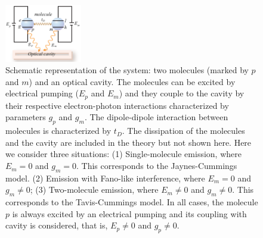 \documentclass[aps,prb,
superscriptaddress,
,twocolumn
,floatfix,footinbib,longbibliography,
]{revtex4-2}
\begin{document}
\begin{figure}
\centering
\includegraphics[width=0.3\textwidth]{junction-1.pdf}
\caption{Schematic representation of the system: two molecules (marked by $p$ and $m$) and an optical cavity. The molecules can be excited by electrical pumping ($E_{p}$ and $E_{m}$) and they couple to the cavity by their respective electron-photon interactions characterized by parameters $g_{p}$ and $g_{m}$. The dipole-dipole interaction between molecules is characterized by $t_{D}$. The dissipation of the molecules and the cavity are included in the theory but not shown here. Here we consider three situations: (1) Single-molecule emission, where $E_{m}=0$ and $g_{m}=0$. This corresponds to the Jaynes-Cummings model. (2) Emission with Fano-like interference, where $E_{m}=0$ and $g_{m}\neq 0$; (3) Two-molecule emission, where $E_{m}\neq 0$ and $g_{m}\neq 0$. This corresponds to the Tavis-Cummings model. In all cases, the molecule $p$ is always excited by an electrical pumping and its coupling with cavity is considered, that is, $E_{p}\neq 0$ and $g_{p}\neq 0$. }
\label{junction-1}
\end{figure}
\end{document}
